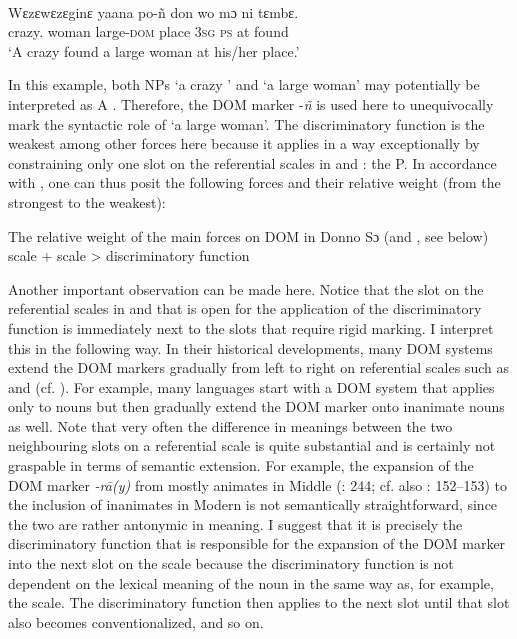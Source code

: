 \documentclass[output=paper]{langsci/langscibook}
\begin{document}
\ea\label{ex:serzant:8}
\\
\gll Wɛzɛwɛzɛginɛ   yaana     po-ñ     don   wo mɔ ni tɛmbɛ.\\
     crazy.  woman    large\textsc{{}-dom}   place  \textsc{3sg} \textsc{ps}  at found\\
\glt ‘A crazy  found a large woman at his/her place.’
\z

In this example, both  NPs ‘a crazy ’ and ‘a large woman’ may potentially be interpreted as A \citep[53]{Culy1995}. Therefore, the DOM marker -\textit{ñ} is used here to unequivocally mark the syntactic role of ‘a large woman’. The discriminatory function is the weakest among other forces here \citep[53]{Culy1995} because it applies in a way exceptionally by constraining only one slot on the referential scales in  and : the   P. In accordance with \citet[51]{Culy1995}, one can thus posit the following forces and their relative weight (from the strongest to the weakest): 

\ea\label{ex:serzant:9}
The relative weight of the main forces on DOM in Donno Sɔ (and , see below)\\
 scale +  scale > discriminatory function\\
\z

Another important observation can be made here. Notice that the slot on the referential scales in  and  that is open for the application of the discriminatory function is immediately next to the slots that require rigid marking. I interpret this in the following way. In their historical developments, many DOM systems extend the DOM markers gradually from left to right on referential scales such as  and  (cf. \citealt{DalrympleNikolaeva2011}). For example, many languages start with a DOM system that applies only to  nouns but then gradually extend the DOM marker onto inanimate nouns as well. Note that very often the difference in meanings between the two neighbouring slots on a referential scale is quite substantial and is certainly not graspable in terms of semantic extension. For example, the expansion of the DOM marker \textit{{}-rā(y)} from mostly animates in Middle  (\citealt{Key2008}: 244; cf. also \citealt{Paul2008}: 152–153) to the inclusion of inanimates in Modern  is not semantically straightforward, since the two are rather antonymic in meaning. I suggest that it is precisely the discriminatory function that is responsible for the expansion of the DOM marker into the next slot on the scale because the discriminatory function is not dependent on the lexical meaning of the noun in the same way as, for example, the  scale. The discriminatory function then applies to the next slot until that slot also becomes conventionalized, and so on. 
\end{document}
